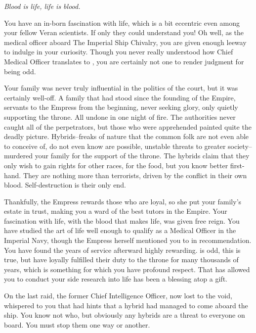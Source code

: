 \documentclass[char]{guildcamp4}
\begin{document}
\name{\cVthree{}}

\textit{Blood is life, life is blood.}

You have an in-born fascination with life, which is a bit eccentric even among your fellow Veran scientists. If only they could understand you! Oh well, as the medical officer aboard The Imperial Ship Chivalry, you are given enough leeway to indulge in your curiosity. Though you never really understood how Chief Medical Officer translates to \cVthree{\Baron}, you are certainly not one to render judgment for being odd.

Your family was never truly influential in the politics of the court, but it was certainly well-off. A family that had stood since the founding of the Empire, servants to the Empress from the beginning, never seeking glory, only quietly supporting the throne. All undone in one night of fire. The authorities never caught all of the perpetrators, but those who were apprehended painted quite the deadly picture. Hybrids--freaks of nature that the common folk are not even able to conceive of, do not even know are possible, unstable threats to greater society--murdered your family for the support of the throne. The hybrids claim that they only wish to gain rights for other races, for the food, but you know better first-hand. They are nothing more than terrorists, driven by the conflict in their own blood. Self-destruction is their only end. 

Thankfully, the Empress rewards those who are loyal, so she put your family's estate in trust, making you a ward of the best tutors in the Empire. Your fascination with life, with the blood that makes life, was given free reign. You have studied the art of life well enough to qualify as a Medical Officer in the Imperial Navy, though the Empress herself mentioned you to \cVone{} in recommendation. You have found the years of service afterward highly rewarding. \cVone{} is odd, this is true, but \cVone{\they} have loyally fulfilled their duty to the throne for many thousands of years, which is something for which you have profound respect. That \cVone{} has allowed you to conduct your side research into life has been a blessing atop a gift. 

On the last raid, the former Chief Intelligence Officer, now lost to the void, whispered to you that  had hints that a hybrid had managed to come aboard the ship. You know not who, but obviously any hybrids are a threat to everyone on board. You must stop them one way or another.
\end{document}
